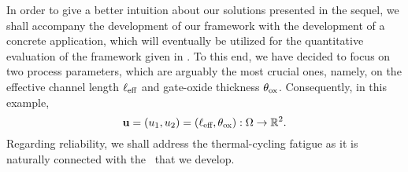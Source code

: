 In order to give a better intuition about our solutions presented in the sequel, we shall accompany the development of our framework with the development of a concrete application, which will eventually be utilized for the quantitative evaluation of the framework given in .
To this end, we have decided to focus on two process parameters, which are arguably the most crucial ones, namely, on the effective channel length $\ell_{\text{eff}}$ and gate-oxide thickness $\theta_{\text{ox}}$.
Consequently, in this example,
\begin{equation} \elab{application-uncertain-parameters}
  \vu = (\u_1, \u_2) = (\Leff, \Tox): \outcomes \to \real^2.
\end{equation}
Regarding reliability, we shall address the thermal-cycling fatigue as it is naturally connected with the \dssta\ that we develop.
